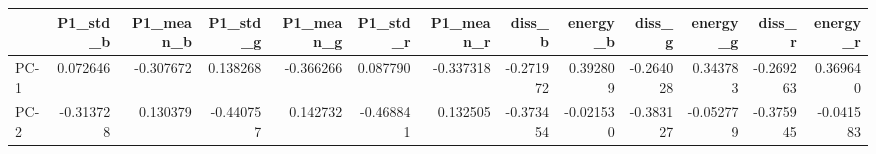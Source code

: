 \begin{tabular}{lrrrrrrrrrrrr}
\toprule
{} &  P1\_std\_b &  P1\_mean\_b &  P1\_std\_g &  P1\_mean\_g &  P1\_std\_r &  P1\_mean\_r &    diss\_b &  energy\_b &    diss\_g &  energy\_g &    diss\_r &  energy\_r \\
\midrule
PC-1 &  0.072646 &  -0.307672 &  0.138268 &  -0.366266 &  0.087790 &  -0.337318 & -0.271972 &  0.392809 & -0.264028 &  0.343783 & -0.269263 &  0.369640 \\
PC-2 & -0.313728 &   0.130379 & -0.440757 &   0.142732 & -0.468841 &   0.132505 & -0.373454 & -0.021530 & -0.383127 & -0.052779 & -0.375945 & -0.041583 \\
\bottomrule
\end{tabular}

